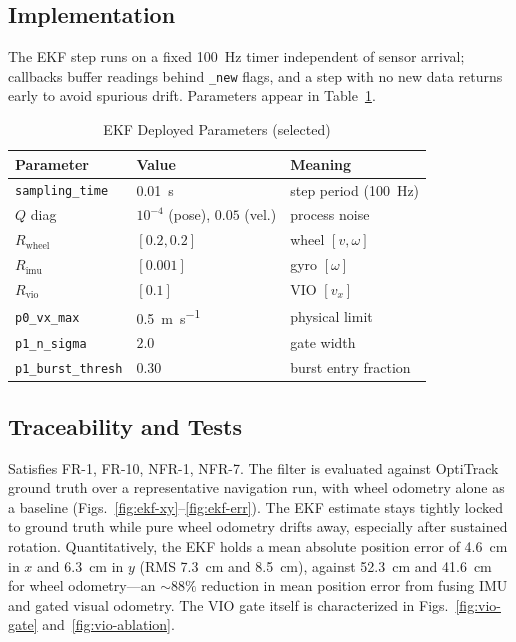 \documentclass[conference]{IEEEtran}
\begin{document}
\subsection{Implementation}
The EKF step runs on a fixed \SI{100}{\hertz} timer independent of sensor arrival;
callbacks buffer readings behind \texttt{\_new} flags, and a step with no new
data returns early to avoid spurious drift. Parameters appear in
Table~\ref{tab:ekf}.

\begin{table}[t]
\caption{EKF Deployed Parameters (selected)}
\label{tab:ekf}
\centering
\begin{tabular}{@{}lll@{}}
\toprule
\textbf{Parameter} & \textbf{Value} & \textbf{Meaning} \\
\midrule
\texttt{sampling\_time} & \SI{0.01}{\second} & step period (\SI{100}{\hertz}) \\
$Q$ diag & $10^{-4}$ (pose), $0.05$ (vel.) & process noise \\
$R_\text{wheel}$ & $[0.2,0.2]$ & wheel $[v,\omega]$ \\
$R_\text{imu}$ & $[0.001]$ & gyro $[\omega]$ \\
$R_\text{vio}$ & $[0.1]$ & VIO $[v_x]$ \\
\texttt{p0\_vx\_max} & \SI{0.5}{\meter\per\second} & physical limit \\
\texttt{p1\_n\_sigma} & $2.0$ & gate width \\
\texttt{p1\_burst\_thresh} & $0.30$ & burst entry fraction \\
\bottomrule
\end{tabular}
\end{table}

\subsection{Traceability and Tests}
Satisfies FR-1, FR-10, NFR-1, NFR-7. The filter is evaluated against OptiTrack
ground truth over a representative navigation run, with wheel odometry alone as a
baseline (Figs.~\ref{fig:ekf-xy}--\ref{fig:ekf-err}). The EKF estimate stays
tightly locked to ground truth while pure wheel odometry drifts away, especially
after sustained rotation. Quantitatively, the EKF holds a mean absolute position
error of \SI{4.6}{\centi\meter} in $x$ and \SI{6.3}{\centi\meter} in $y$
(RMS \SI{7.3}{\centi\meter} and \SI{8.5}{\centi\meter}), against
\SI{52.3}{\centi\meter} and \SI{41.6}{\centi\meter} for wheel odometry---an
${\sim}88\%$ reduction in mean position error from fusing IMU and gated visual
odometry. The VIO gate itself is characterized in Figs.~\ref{fig:vio-gate}
and~\ref{fig:vio-ablation}.
\end{document}
